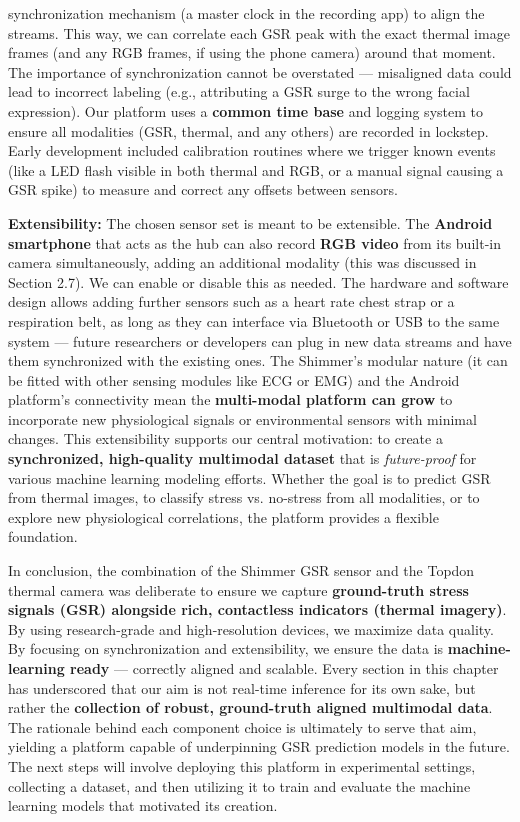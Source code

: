 \documentclass[11pt,a4paper]{report}
\begin{document}
synchronization mechanism (a master clock in the recording app) to align
the streams. This way, we can correlate each GSR peak with the exact
thermal image frames (and any RGB frames, if using the phone camera)
around that moment. The importance of synchronization cannot be
overstated --- misaligned data could lead to incorrect labeling (e.g.,
attributing a GSR surge to the wrong facial expression). Our platform
uses a \textbf{common time base} and logging system to ensure all modalities
(GSR, thermal, and any others) are recorded in lockstep. Early
development included calibration routines where we trigger known events
(like a LED flash visible in both thermal and RGB, or a manual signal
causing a GSR spike) to measure and correct any offsets between sensors.

\textbf{Extensibility:} The chosen sensor set is meant to be extensible. The
\textbf{Android smartphone} that acts as the hub can also record \textbf{RGB
video} from its built-in camera simultaneously, adding an additional
modality (this was discussed in Section 2.7). We can enable or disable
this as needed. The hardware and software design allows adding further
sensors such as a heart rate chest strap or a respiration belt, as long
as they can interface via Bluetooth or USB to the same system --- future
researchers or developers can plug in new data streams and have them
synchronized with the existing ones. The Shimmer's modular nature (it
can be fitted with other sensing modules like ECG or EMG) and the
Android platform's connectivity mean the \textbf{multi-modal platform can
grow} to incorporate new physiological signals or environmental sensors
with minimal changes. This extensibility supports our central
motivation: to create a \textbf{synchronized, high-quality multimodal
dataset} that is \textit{future-proof} for various machine learning modeling
efforts. Whether the goal is to predict GSR from thermal images, to
classify stress vs. no-stress from all modalities, or to explore new
physiological correlations, the platform provides a flexible foundation.

In conclusion, the combination of the Shimmer GSR sensor and the Topdon
thermal camera was deliberate to ensure we capture \textbf{ground-truth stress
signals (GSR) alongside rich, contactless indicators (thermal
imagery)}. By using research-grade and high-resolution devices, we
maximize data quality. By focusing on synchronization and extensibility,
we ensure the data is \textbf{machine-learning ready} --- correctly aligned
and scalable. Every section in this chapter has underscored that our aim
is not real-time inference for its own sake, but rather the \textbf{collection
of robust, ground-truth aligned multimodal data}. The rationale behind
each component choice is ultimately to serve that aim, yielding a
platform capable of underpinning GSR prediction models in the
future. The next steps will involve deploying this platform in
experimental settings, collecting a dataset, and then
utilizing it to train and evaluate the machine learning models that
motivated its creation.



\end{document}
